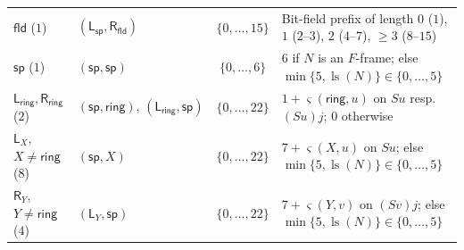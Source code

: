 \documentclass[11pt,reqno]{amsart}
\numberwithin{equation}{section}
\theoremstyle{plain}
\theoremstyle{definition}
\theoremstyle{remark}
\DeclareMathOperator{\ls}{ls}
\begin{document}
\begin{table}[htbp]
\begin{tabular}{@{}llcl@{}}
$\mathsf{fld}$ ($1$) & $(\mathsf{L}_{\mathsf{sp}}, \mathsf{R}_{\mathsf{fld}})$ & $\{0,\dots,15\}$ & Bit-field prefix of length $0$ ($1$), $1$ ($2\text{--}3$), $2$ ($4\text{--}7$), $\ge 3$ ($8\text{--}15$) \\
$\mathsf{sp}$ ($1$) & $(\mathsf{sp}, \mathsf{sp})$ & $\{0,\dots,6\}$ & $6$ if $N$ is an $F$-frame; else $\min\{5, \ls(N)\} \in \{0,\dots,5\}$ \\
$\mathsf{L}_{\mathsf{ring}}, \mathsf{R}_{\mathsf{ring}}$ ($2$) & $(\mathsf{sp}, \mathsf{ring}),\, (\mathsf{L}_{\mathsf{ring}}, \mathsf{sp})$ & $\{0,\dots,22\}$ & $1 + \varsigma(\mathsf{ring}, u)$ on $S u$ resp.\ $(S u) j$; $0$ otherwise \\
$\mathsf{L}_X$, $X \ne \mathsf{ring}$ ($8$) & $(\mathsf{sp}, X)$ & $\{0,\dots,22\}$ & $7 + \varsigma(X, u)$ on $S u$; else $\min\{5, \ls(N)\} \in \{0,\dots,5\}$ \\
$\mathsf{R}_Y$, $Y \ne \mathsf{ring}$ ($4$) & $(\mathsf{L}_Y, \mathsf{sp})$ & $\{0,\dots,22\}$ & $7 + \varsigma(Y, v)$ on $(S v) j$; else $\min\{5, \ls(N)\} \in \{0,\dots,5\}$ \\
\bottomrule
\end{tabular}
\end{table}
\end{document}
